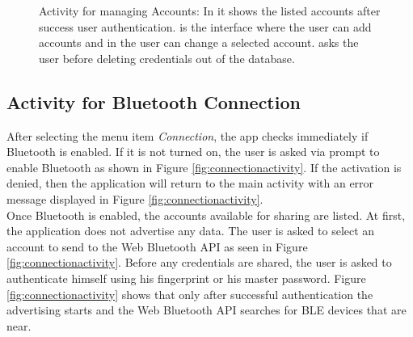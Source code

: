 \begin{figure}[H]
\qquad
{}
\caption[Activity for managing Accounts]{Activity for managing Accounts: In \protect{} it shows the listed accounts after success user authentication. \protect{} is the interface where the user can add accounts and in \protect{} the user can change a selected account. \protect{} asks the user before deleting credentials out of the database.}
\label{fig:accountactivity}
\end{figure}


\subsection{Activity for Bluetooth Connection}
After selecting the menu item \textit{Connection}, the app checks immediately if Bluetooth is enabled. If it is not turned on, the user is asked via prompt to enable Bluetooth as shown in Figure \ref{fig:connectionactivity}\protect{}.
If the activation is denied, then the application will return to the main activity with an error message displayed in Figure \ref{fig:connectionactivity}\protect{}. \\

Once Bluetooth is enabled, the accounts available for sharing are listed.
At first, the application does not advertise any data. The user is asked to select an account to send to the Web Bluetooth API as seen in Figure \ref{fig:connectionactivity}\protect{}. Before any credentials are shared, the user is asked to authenticate himself using his fingerprint or his master password. Figure \ref{fig:connectionactivity}\protect{} shows that only after successful authentication the advertising starts and the Web Bluetooth API searches for BLE devices that are near.

